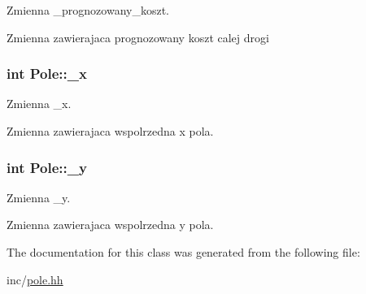 Zmienna \+\_\+prognozowany\+\_\+koszt. 

Zmienna zawierajaca prognozowany koszt calej drogi \hypertarget{class_pole_a38ab32b71efba3ca72d77a5eec62ca83}{
\subsubsection[{\+\_\+x}]{\setlength{\rightskip}{0pt plus 5cm}int Pole\+::\+\_\+x\hspace{0.3cm}{\ttfamily [private]}}}\label{class_pole_a38ab32b71efba3ca72d77a5eec62ca83}


Zmienna \+\_\+x. 

Zmienna zawierajaca wspolrzedna x pola. \hypertarget{class_pole_ad6807e222bca77d3f8185f69e483b1ee}{
\subsubsection[{\+\_\+y}]{\setlength{\rightskip}{0pt plus 5cm}int Pole\+::\+\_\+y\hspace{0.3cm}{\ttfamily [private]}}}\label{class_pole_ad6807e222bca77d3f8185f69e483b1ee}


Zmienna \+\_\+y. 

Zmienna zawierajaca wspolrzedna y pola. 

The documentation for this class was generated from the following file\+:\begin{DoxyCompactItemize}
\item 
inc/\hyperlink{pole_8hh}{pole.\+hh}\end{DoxyCompactItemize}
